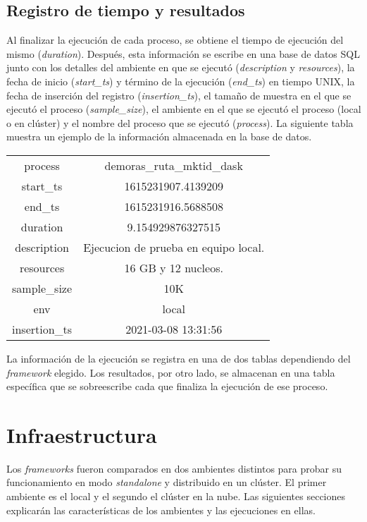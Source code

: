 \subsection{Registro de tiempo y resultados}

Al finalizar la ejecución de cada proceso, se obtiene el tiempo de ejecución del mismo (\textit{duration}). Después, esta información se escribe en una base de datos SQL junto con los detalles del ambiente en que se ejecutó (\textit{description} y \textit{resources}), la fecha de inicio (\textit{start\_ts}) y término de la ejecución (\textit{end\_ts}) en tiempo UNIX, la fecha de inserción del registro (\textit{insertion\_ts}), el tamaño de muestra en el que se ejecutó el proceso (\textit{sample\_size}), el ambiente en el que se ejecutó el proceso (local o en clúster) y el nombre del proceso que se ejecutó (\textit{process}). La siguiente tabla muestra un ejemplo de la información almacenada en la base de datos.

\begin{center}
\begin{tabular}{|c|c|}
 \hline
  process & demoras\_ruta\_mktid\_dask \\ 
  start\_ts & 1615231907.4139209 \\
  end\_ts & 1615231916.5688508 \\ 
  duration & 9.154929876327515 \\ 
  description & Ejecucion de prueba en equipo local. \\
  resources & 16 GB y 12 nucleos. \\
  sample\_size & 10K \\
  env & local \\
  insertion\_ts & 2021-03-08 13:31:56 \\
  \hline
\end{tabular}
\end{center}


La información de la ejecución se registra en una de dos tablas dependiendo del \textit{framework} elegido. Los resultados, por otro lado, se almacenan en una tabla específica que se sobreescribe cada que finaliza la ejecución de ese proceso. 

\section{Infraestructura}

Los \textit{frameworks} fueron comparados en dos ambientes distintos para probar su funcionamiento en modo \textit{standalone} y distribuido en un clúster. El primer ambiente es el local y el segundo el clúster en la nube. Las siguientes secciones explicarán las características de los ambientes y las ejecuciones en ellas.


